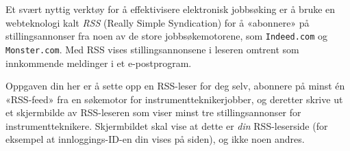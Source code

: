 

Et svært nyttig verktøy for å effektivisere elektronisk jobbsøking er å bruke en webteknologi kalt {\it RSS} (Really Simple Syndication) for å «abonnere» på stillingsannonser fra noen av de store jobbsøkemotorene, som {\tt Indeed.com} og {\tt Monster.com}. Med RSS vises stillingsannonsene i leseren omtrent som innkommende meldinger i et e-postprogram.

Oppgaven din her er å sette opp en RSS-leser for deg selv, abonnere på minst én «RSS-feed» fra en søkemotor for instrumentteknikerjobber, og deretter skrive ut et skjermbilde av RSS-leseren som viser minst tre stillingsannonser for instrumentteknikere. Skjermbildet skal vise at dette er {\it din} RSS-leserside (for eksempel at innloggings-ID-en din vises på siden), og ikke noen andres.


















